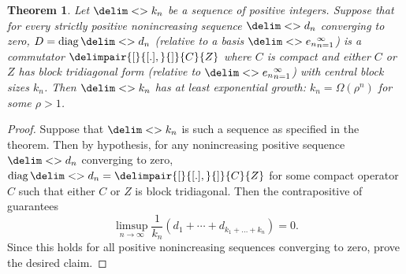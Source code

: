\documentclass[10pt,reqno]{amsart}
\newtheorem{theorem}{Theorem}[section]
\theoremstyle{remark}
\DeclareMathOperator{\diag}{diag}
\newcommand{\seq}{\delim<>}
\newcommand{\comm}{\delimpair{[}{[.],}{]}}
\numberwithin{equation}{section}
\begin{document}
\begin{theorem}
  \label{thm:exponential-growth-block-size-required}
  Let $\seq{k_n}$ be a sequence of positive integers.
  Suppose that for every strictly positive nonincreasing sequence $\seq{d_n}$ converging to zero, $D = \diag\seq{d_n}$ (relative to a basis $\seq{e_n}_{n=1}^{\infty}$) is a commutator $\comm{C}{Z}$ where $C$ is compact and either $C$ or $Z$ has block tridiagonal form (relative to $\seq{e_n}_{n=1}^{\infty}$) with central block sizes $k_n$.
  Then $\seq{k_n}$ has at least exponential growth: $k_n = \Omega(\rho^n)$ for some $\rho > 1$.
\end{theorem}

\begin{proof}
  Suppose that $\seq{k_n}$ is such a sequence as specified in the theorem.
  Then by hypothesis, for any nonincreasing positive sequence $\seq{d_n}$ converging to zero, $\diag\seq{d_n} = \comm{C}{Z}$ for some compact operator $C$ such that either $C$ or $Z$ is block tridiagonal.
  Then the contrapositive of  guarantees
  \begin{equation*}
    \limsup_{n \to \infty} \frac{1}{k_n}\left(d_1 +  \cdots + d_{k_1+\dots+k_n}\right) = 0.
  \end{equation*}
  Since this holds for all positive nonincreasing sequences converging to zero,  prove the desired claim.
\end{proof}
\end{document}
